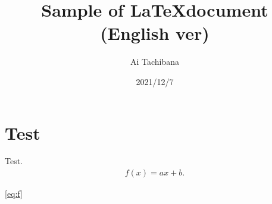 \documentclass{article}
\begin{document}
    \title{Sample of \LaTeX document (English ver)}
    \author{Ai Tachibana}
    \date{2021/12/7}
    \maketitle

    \section{Test}
    Test.
    \begin{align}
        f(x) = ax + b. \label{eq:f}
    \end{align}
    
    \eqref{eq:f}
\end{document}
